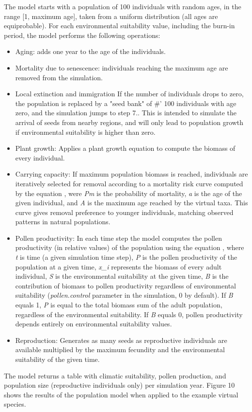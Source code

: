 \documentclass[letterpaper]{book}
\begin{document}
\begin{Details}\relax
The model starts with a population of 100 individuals with random ages, in the range [1, maximum age], taken from a uniform distribution (all ages are equiprobable). For each environmental suitability value, including the burn-in period, the model performs the following operations:

\begin{itemize}

\item Aging: adds one year to the age of the individuals.
\item Mortality due to senescence: individuals reaching the maximum age are removed from the simulation.
\item Local extinction and immigration If the number of individuals drops to zero, the population is replaced by a "seed bank" of \#' 100 individuals with age zero, and the simulation jumps to step 7.. This is intended to simulate the arrival of seeds from nearby regions, and will only lead to population growth if environmental suitability is higher than zero.
\item Plant growth: Applies a plant growth equation to compute the biomass of every individual.
\item Carrying capacity: If maximum population biomass is reached, individuals are iteratively selected for removal according to a mortality risk curve computed by the equation , were \emph{Pm} is the probability of mortality, \emph{a} is the age of the given individual, and \emph{A} is the maximum age reached by the virtual taxa. This curve gives removal preference to younger individuals, matching observed patterns in natural populations.
\item Pollen productivity: In each time step the model computes the pollen productivity (in relative values) of the population using the equation , where \emph{t} is time (a given simulation time step), \emph{P} is the pollen productivity of the population at a given time, \emph{x\_i} represents the biomass of every adult individual, \emph{S} is the environmental suitability at the given time, \emph{B} is the contribution of biomass to pollen productivity regardless of environmental suitability (\emph{pollen.control} parameter in the simulation, 0 by default). If \emph{B} equals 1, \emph{P} is equal to the total biomass sum of the adult population, regardless of the environmental suitability. If \emph{B} equals 0, pollen productivity depends entirely on environmental suitability values.
\item Reproduction: Generates as many seeds as reproductive individuals are available multiplied by the maximum fecundity and the environmental suitability of the given time.

\end{itemize}

The model returns a table with climatic suitability, pollen production, and population size (reproductive individuals only) per simulation year. Figure 10 shows the results of the population model when applied to the example virtual species.
\end{Details}
\end{document}
